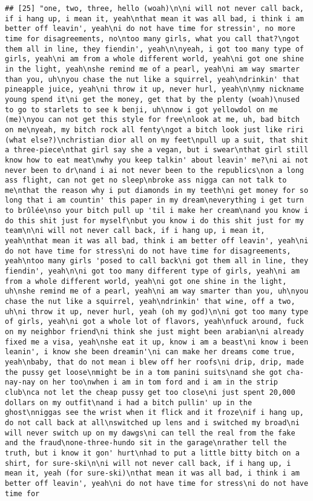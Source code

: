 \documentclass[]{article}
\begin{document}
\begin{verbatim}
## [25] "one, two, three, hello (woah)\n\ni will not never call back, if i hang up, i mean it, yeah\nthat mean it was all bad, i think i am better off leavin', yeah\ni do not have time for stressin', no more time for disagreements, no\ntoo many girls, what you call that?\ngot them all in line, they fiendin', yeah\n\nyeah, i got too many type of girls, yeah\ni am from a whole different world, yeah\ni got one shine in the light, yeah\nshe remind me of a pearl, yeah\ni am way smarter than you, uh\nyou chase the nut like a squirrel, yeah\ndrinkin' that pineapple juice, yeah\ni throw it up, never hurl, yeah\n\nmy nickname young spend it\ni get the money, get that by the plenty (woah)\nused to go to starlets to see k benji, uh\nnow i got yellowdol on me (me)\nyou can not get this style for free\nlook at me, uh, bad bitch on me\nyeah, my bitch rock all fenty\ngot a bitch look just like riri (what else?)\nchristian dior all on my feet\npull up a suit, that shit a three-piece\nthat girl say she a vegan, but i swear\nthat girl still know how to eat meat\nwhy you keep talkin' about leavin' me?\ni ai not never been to dr\nand i ai not never been to the republics\non a long ass flight, can not get no sleep\nbroke ass nigga can not talk to me\nthat the reason why i put diamonds in my teeth\ni get money for so long that i am countin' this paper in my dream\neverything i get turn to brûlée\nso your bitch pull up 'til i make her cream\nand you know i do this shit just for myself\nbut you know i do this shit just for my team\n\ni will not never call back, if i hang up, i mean it, yeah\nthat mean it was all bad, think i am better off leavin', yeah\ni do not have time for stress\ni do not have time for disagreements, yeah\ntoo many girls 'posed to call back\ni got them all in line, they fiendin', yeah\n\ni got too many different type of girls, yeah\ni am from a whole different world, yeah\ni got one shine in the light, uh\nshe remind me of a pearl, yeah\ni am way smarter than you, uh\nyou chase the nut like a squirrel, yeah\ndrinkin' that wine, off a two, uh\ni throw it up, never hurl, yeah (oh my god)\n\ni got too many type of girls, yeah\ni got a whole lot of flavors, yeah\nfuck around, fuck on my neighbor friend\ni think she just might been arabian\ni already fixed me a visa, yeah\nshe eat it up, know i am a beast\ni know i been leanin', i know she been dreamin'\ni can make her dreams come true, yeah\nbaby, that do not mean i blew off her roofs\ni drip, drip, made the pussy get loose\nmight be in a tom panini suits\nand she got cha-nay-nay on her too\nwhen i am in tom ford and i am in the strip club\nca not let the cheap pussy get too close\ni just spent 20,000 dollars on my outfit\nand i had a bitch pullin' up in the ghost\nniggas see the wrist when it flick and it froze\nif i hang up, do not call back at all\nswitched up lens and i switched my broad\ni will never switch up on my dawgs\ni can tell the real from the fake and the fraud\none-three-hundo sit in the garage\nrather tell the truth, but i know it gon' hurt\nhad to put a little bitty bitch on a shirt, for sure-ski\n\ni will not never call back, if i hang up, i mean it, yeah (for sure-ski)\nthat mean it was all bad, i think i am better off leavin', yeah\ni do not have time for stress\ni do not have time for 
\end{verbatim}
\end{document}
